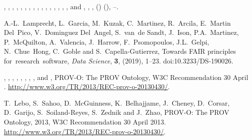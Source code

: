 \documentclass[ds,v1.1.2,openaccess]{iosart2x}%
\begin{document}
\begin{thebibliography}{}
%
\begin{barticle}
,
,
,
,
,
,
,
,
,
,
,
,
,
,
,
,
 and
,
,
,
()
(),
--.
\end{barticle}
%
\OrigBibText
A.-L.~Lamprecht,
L.~Garcia,
M.~Kuzak,
C.~Martinez,
R.~Arcila,
E.~Martin Del~Pico,
V.~Dominguez Del~Angel,
S.~van~de Sandt,
J.~Ison,
P.A.~Martinez,
P.~{McQuilton},
A.~Valencia,
J.~Harrow,
F.~Psomopoulos,
J.L.~Gelpi,
N.~Chue~Hong,
C.~Goble and
S.~Capella-Gutierrez,
Towards {FAIR} principles for~research~software,
\textit{Data Science}, \textbf{3},
(2019),
1--23.
doi:10.3233/DS-190026.
\endOrigBibText
{}
\endbibitem

%
\begin{botherref}
,
,
,
,
,
,
,
,
 and
,
PROV-O: The PROV Ontology,
W3C Recommendation 30 April .
\url{http://www.w3.org/TR/2013/REC-prov-o-20130430/}.
\end{botherref}
%
\OrigBibText
T.~Lebo,
S.~Sahoo,
D.~McGuinness,
K.~Belhajjame,
J.~Cheney,
D.~Corsar,
D.~Garijo,
S.~Soiland-Reyes,
S.~Zednik and
J.~Zhao,
PROV-O: The PROV Ontology,
2013,
W3C Recommendation 30 April 2013.
\url{http://www.w3.org/TR/2013/REC-prov-o-20130430/}.
\endOrigBibText
{}
\endbibitem


\end{thebibliography}
\end{document}
